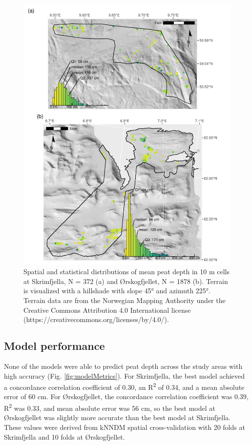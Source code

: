 \documentclass[soil, manuscript]{copernicus}
\begin{document}
\begin{figure}
\includegraphics[height=0.81\textheight]{figures/map-distribution} \caption{Spatial and statistical distributions of mean peat depth in 10 m cells at Skrimfjella, N = 372 (a) and Ørskogfjellet, N = 1878 (b). Terrain is visualized with a hillshade with slope 45° and azimuth 225°. Terrain data are from the Norwegian Mapping Authority under the Creative Commons Attribution 4.0 International license (https://creativecommons.org/licenses/by/4.0/).}\label{fig:map-distribution}
\end{figure}

\subsection{Model performance}

None of the models were able to predict peat depth across the study areas with high accuracy (Fig. \ref{fig:modelMetrics}).
For Skrimfjella, the best model achieved a concordance correlation coefficient of 0.30, an R\textsuperscript{2} of 0.34, and a mean absolute error of 60 cm.
For Ørskogfjellet, the concordance correlation coefficient was 0.39, R\textsuperscript{2} was 0.33, and mean absolute error was 56 cm, so the best model at Ørskogfjellet was slightly more accurate than the best model at Skrimfjella.
These values were derived from kNNDM spatial cross-validation with 20 folds at Skrimfjella and 10 folds at Ørskogfjellet.
\end{document}

